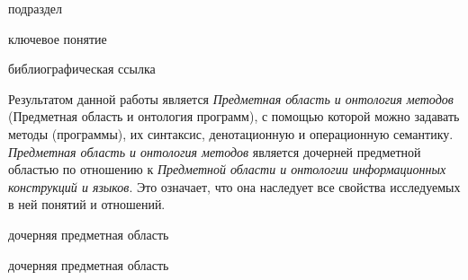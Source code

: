 \begin{SCn}

\begin{scnrelfromlist}{подраздел}
\end{scnrelfromlist}

\bigskip

\begin{scnrelfromlist}{ключевое понятие}
	\scnitem{***}
\end{scnrelfromlist}

\bigskip

\begin{scnrelfromlist}{библиографическая ссылка}
	\scnitem{***}
\end{scnrelfromlist}

\end{SCn}

Результатом данной работы является \textit{Предметная область и онтология методов} (Предметная область и онтология программ), с помощью которой можно задавать методы (программы), их синтаксис, денотационную и операционную семантику. \textit{Предметная область и онтология методов} является дочерней предметной областью по отношению к \textit{Предметной области и онтологии информационных конструкций и языков}. Это означает, что она наследует все свойства исследуемых в ней понятий и отношений.

\begin{SCn}
\begin{scnrelfromlist}{дочерняя предметная область}
    \begin{scnindent}
        \begin{scnrelfromlist}{дочерняя предметная область}
        \end{scnrelfromlist}
    \end{scnindent}
\end{scnrelfromlist}
\end{SCn}

